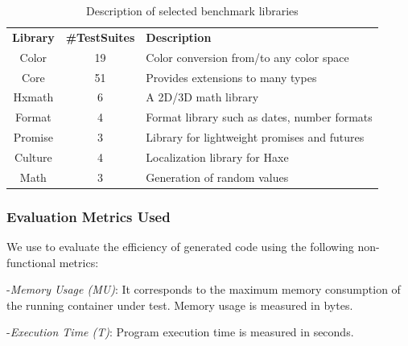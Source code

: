\begin{table}[h]
	\centering

	\begin{tabular}{|c|c|p{4.3cm}|}
		\hline
		\textbf{Library} & \textbf{\#TestSuites} & \textbf{Description} \\
		\hhline{|=|=|=|}
		Color  &  19 &  Color conversion from/to any color space   \\ \hline
		Core & 51  & Provides extensions to many types  \\ \hline
		Hxmath & 6  & A 2D/3D math library  \\ \hline
	    Format  &  4 & Format library such as dates, number formats   \\ \hline
		Promise & 3  & Library for lightweight promises and futures  \\ \hline
		Culture & 4  & Localization library for Haxe \\ \hline
		Math & 3  & Generation of random values \\ \hline
	\end{tabular}
		\caption{Description of selected benchmark libraries}
		\label{my-label}
\end{table}

\subsubsection{Evaluation Metrics Used}
We use to evaluate the efficiency of generated code using the following non-functional metrics:

-\textit{Memory Usage (MU)}:
It corresponds to the maximum memory consumption of the running container under test. Memory usage is measured in bytes.

-\textit{Execution Time (T)}:
Program execution time is measured in seconds.
 
